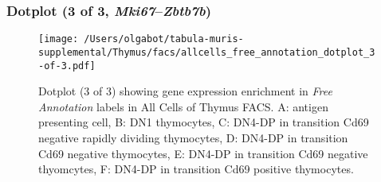 \clearpage

\subsubsection{Dotplot (3 of 3, \emph{Mki67}--\emph{Zbtb7b})}
\begin{figure}[h]
\centering
\texttt{[image: /Users/olgabot/tabula-muris-supplemental/Thymus/facs/allcells\_free\_annotation\_dotplot\_3-of-3.pdf]}

\caption{ Dotplot (3 of 3)  showing gene expression enrichment in \emph{Free Annotation} labels in All Cells of Thymus FACS. A: antigen presenting cell, B: DN1 thymocytes, C: DN4-DP in transition Cd69 negative rapidly dividing thymocytes, D: DN4-DP in transition Cd69 negative thymocytes, E: DN4-DP in transition Cd69 negative thyomcytes, F: DN4-DP in transition Cd69 positive thymocytes.}
\end{figure}

